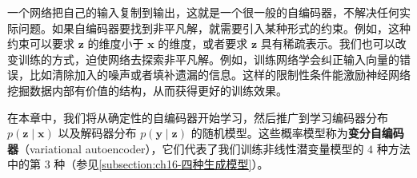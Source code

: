 \documentclass[../main.tex]{subfiles}
\begin{document}
一个网络把自己的输入复制到输出，这就是一个很一般的自编码器，不解决任何实际问题。如果自编码器要找到非平凡解，就需要引入某种形式的约束。例如，这种约束可以要求 $\bm{z}$ 的维度小于 $\bm{x}$ 的维度，或者要求 $\bm{z}$ 具有稀疏表示。我们也可以改变训练的方式，迫使网络去探索非平凡解。例如，训练网络学会纠正输入向量的错误，比如清除加入的噪声或者填补遗漏的信息。这样的限制性条件能激励神经网络挖掘数据内部有价值的结构，从而获得更好的训练效果。

在本章中，我们将从确定性的自编码器开始学习，然后推广到学习编码器分布 $p(\bm{z}\mid\bm{x})$ 以及解码器分布 $p(\bm{y}\mid\bm{z})$ 的随机模型。这些概率模型称为\textbf{变分自编码器}（variational autoencoder），它们代表了我们训练非线性潜变量模型的 $4$ 种方法中的第 $3$ 种（参见\cref{subsection:ch16-四种生成模型}）。




\end{document}
